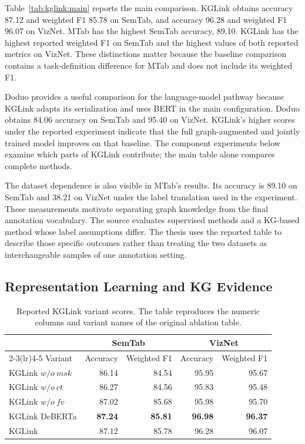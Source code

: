 Table~\ref{tab:kglink:main} reports the main comparison. KGLink obtains accuracy 87.12 and weighted F1 85.78 on SemTab, and accuracy 96.28 and weighted F1 96.07 on VizNet. MTab has the highest SemTab accuracy, 89.10. KGLink has the highest reported weighted F1 on SemTab and the highest values of both reported metrics on VizNet. These distinctions matter because the baseline comparison contains a task-definition difference for MTab and does not include its weighted F1.

Doduo provides a useful comparison for the language-model pathway because KGLink adapts its serialization and uses BERT in the main configuration. Doduo obtains 84.06 accuracy on SemTab and 95.40 on VizNet. KGLink's higher scores under the reported experiment indicate that the full graph-augmented and jointly trained model improves on that baseline. The component experiments below examine which parts of KGLink contribute; the main table alone compares complete methods.

The dataset dependence is also visible in MTab's results. Its accuracy is 89.10 on SemTab and 38.21 on VizNet under the label translation used in the experiment. These measurements motivate separating graph knowledge from the final annotation vocabulary. The source evaluates supervised methods and a KG-based method whose label assumptions differ. The thesis uses the reported table to describe those specific outcomes rather than treating the two datasets as interchangeable samples of one annotation setting.

\subsection{Representation Learning and KG Evidence}
\label{sec:kglink:ablation}

\begin{table}[tbp]
\centering
\caption{Reported KGLink variant scores. The table reproduces the numeric columns and variant names of the original ablation table.}
\label{tab:kglink:ablation}
\begin{tabular}{lrrrr}
\toprule
&\multicolumn{2}{c}{SemTab}&\multicolumn{2}{c}{VizNet}\\
\cmidrule(lr){2-3}\cmidrule(lr){4-5}
Variant&Accuracy&Weighted F1&Accuracy&Weighted F1\\
\midrule
KGLink $w/o\ msk$&86.14&84.54&95.95&95.67\\
KGLink $w/o\ ct$&86.27&84.56&95.83&95.48\\
KGLink $w/o\ fv$&87.02&85.68&95.98&95.70\\
KGLink DeBERTa&\textbf{87.24}&\textbf{85.81}&\textbf{96.98}&\textbf{96.37}\\
KGLink&87.12&85.78&96.28&96.07\\
\bottomrule
\end{tabular}
\end{table}

